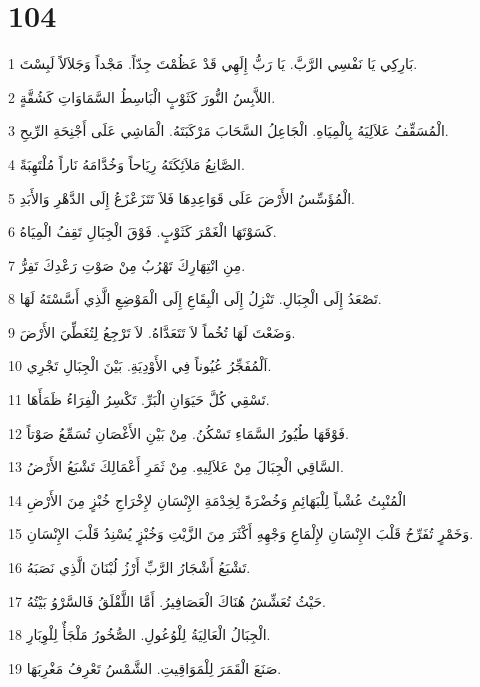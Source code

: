 \chapter{104}

\par 1 بَارِكِي يَا نَفْسِي الرَّبَّ. يَا رَبُّ إِلَهِي قَدْ عَظُمْتَ جِدّاً. مَجْداً وَجَلاَلاً لَبِسْتَ.
\par 2 اللاَّبِسُ النُّورَ كَثَوْبٍ الْبَاسِطُ السَّمَاوَاتِ كَشُقَّةٍ.
\par 3 الْمُسَقِّفُ عَلاَلِيَهُ بِالْمِيَاهِ. الْجَاعِلُ السَّحَابَ مَرْكَبَتَهُ. الْمَاشِي عَلَى أَجْنِحَةِ الرِّيحِ.
\par 4 الصَّانِعُ مَلاَئِكَتَهُ رِيَاحاً وَخُدَّامَهُ نَاراً مُلْتَهِبَةً.
\par 5 الْمُؤَسِّسُ الأَرْضَ عَلَى قَوَاعِدِهَا فَلاَ تَتَزَعْزَعُ إِلَى الدَّهْرِ وَالأَبَدِ.
\par 6 كَسَوْتَهَا الْغَمْرَ كَثَوْبٍ. فَوْقَ الْجِبَالِ تَقِفُ الْمِيَاهُ.
\par 7 مِنِ انْتِهَارِكَ تَهْرُبُ مِنْ صَوْتِ رَعْدِكَ تَفِرُّ.
\par 8 تَصْعَدُ إِلَى الْجِبَالِ. تَنْزِلُ إِلَى الْبِقَاعِ إِلَى الْمَوْضِعِ الَّذِي أَسَّسْتَهُ لَهَا.
\par 9 وَضَعْتَ لَهَا تُخُماً لاَ تَتَعَدَّاهُ. لاَ تَرْجِعُ لِتُغَطِّيَ الأَرْضَ.
\par 10 اَلْمُفَجِّرُ عُيُوناً فِي الأَوْدِيَةِ. بَيْنَ الْجِبَالِ تَجْرِي.
\par 11 تَسْقِي كُلَّ حَيَوَانِ الْبَرِّ. تَكْسِرُ الْفِرَاءُ ظَمَأَهَا.
\par 12 فَوْقَهَا طُيُورُ السَّمَاءِ تَسْكُنُ. مِنْ بَيْنِ الأَغْصَانِ تُسَمِّعُ صَوْتاً.
\par 13 السَّاقِي الْجِبَالَ مِنْ عَلاَلِيهِ. مِنْ ثَمَرِ أَعْمَالِكَ تَشْبَعُ الأَرْضُ.
\par 14 الْمُنْبِتُ عُشْباً لِلْبَهَائِمِ وَخُضْرَةً لِخِدْمَةِ الإِنْسَانِ لإِخْرَاجِ خُبْزٍ مِنَ الأَرْضِ
\par 15 وَخَمْرٍ تُفَرِّحُ قَلْبَ الإِنْسَانِ لإِلْمَاعِ وَجْهِهِ أَكْثَرَ مِنَ الزَّيْتِ وَخُبْزٍ يُسْنِدُ قَلْبَ الإِنْسَانِ.
\par 16 تَشْبَعُ أَشْجَارُ الرَّبِّ أَرْزُ لُبْنَانَ الَّذِي نَصَبَهُ.
\par 17 حَيْثُ تُعَشِّشُ هُنَاكَ الْعَصَافِيرُ. أَمَّا اللَّقْلَقُ فَالسَّرْوُ بَيْتُهُ.
\par 18 الْجِبَالُ الْعَالِيَةُ لِلْوُعُولِ. الصُّخُورُ مَلْجَأٌ لِلْوِبَارِ.
\par 19 صَنَعَ الْقَمَرَ لِلْمَوَاقِيتِ. الشَّمْسُ تَعْرِفُ مَغْرِبَهَا.
